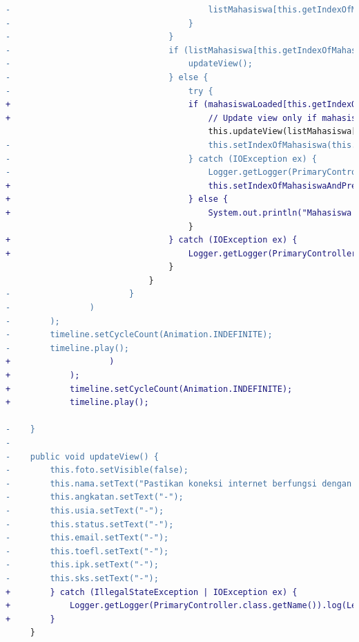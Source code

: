\begin{lstlisting}[language=diff, caption=Perbedaan kode dosen dengan mahasiswa, label=diff_dosen_mahasiswa]
-                                        listMahasiswa[this.getIndexOfMahasiswa()] = puller.pullMahasiswaDetail(listMahasiswa[this.getIndexOfMahasiswa()]);
-                                    }
-                                }
-                                if (listMahasiswa[this.getIndexOfMahasiswa()].getTanggalLahir() == null) {
-                                    updateView();
-                                } else {
-                                    try {
+                                    if (mahasiswaLoaded[this.getIndexOfMahasiswa()]) {
+                                        // Update view only if mahasiswa is loaded. Otherwise, wait for next turn
                                         this.updateView(listMahasiswa[this.getIndexOfMahasiswa()]);
-                                        this.setIndexOfMahasiswa(this.getIndexOfMahasiswa() + 1);
-                                    } catch (IOException ex) {
-                                        Logger.getLogger(PrimaryController.class.getName()).log(Level.SEVERE, null, ex);
+                                        this.setIndexOfMahasiswaAndPreload((this.getIndexOfMahasiswa() + 1) % listMahasiswa.length);
+                                    } else {
+                                        System.out.println("Mahasiswa " + listMahasiswa[this.getIndexOfMahasiswa()].getNama() + " is not ready. Waiting for next turn...");
                                     }
+                                } catch (IOException ex) {
+                                    Logger.getLogger(PrimaryController.class.getName()).log(Level.SEVERE, null, ex);
                                 }
                             }
-                        }
-                )
-        );
-        timeline.setCycleCount(Animation.INDEFINITE);
-        timeline.play();
+                    )
+            );
+            timeline.setCycleCount(Animation.INDEFINITE);
+            timeline.play();
 
-    }
-
-    public void updateView() {
-        this.foto.setVisible(false);
-        this.nama.setText("Pastikan koneksi internet berfungsi dengan normal!");
-        this.angkatan.setText("-");
-        this.usia.setText("-");
-        this.status.setText("-");
-        this.email.setText("-");
-        this.toefl.setText("-");
-        this.ipk.setText("-");
-        this.sks.setText("-");
+        } catch (IllegalStateException | IOException ex) {
+            Logger.getLogger(PrimaryController.class.getName()).log(Level.SEVERE, null, ex);
+        }
     }
 

\end{lstlisting}
